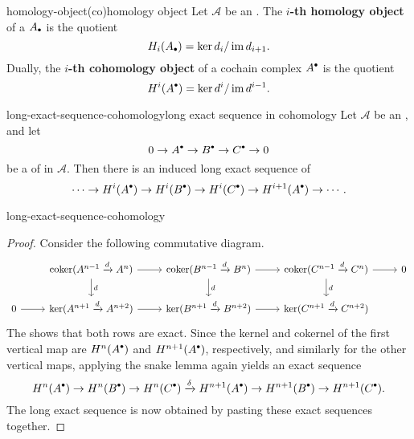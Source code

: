 \begin{topic}{homology-object}{(co)homology object}
    Let $\mathcal{A}$ be an . The \textbf{$i$-th homology object} of a  $A_\bdot$ is the quotient
    \[ H_i(A_\bdot) = \ker d_i / \im d_{i + 1} . \]
    Dually, the \textbf{$i$-th cohomology object} of a cochain complex $A^\bdot$ is the quotient
    \[ H^i(A^\bdot) = \ker d^i / \im d^{i - 1} . \]
\end{topic}

\begin{topic}{long-exact-sequence-cohomology}{long exact sequence in cohomology}
    Let $\mathcal{A}$ be an , and let
    \[ 0 \rightarrow A^\bdot \rightarrow B^\bdot \rightarrow C^\bdot \rightarrow 0 \]
    be a  of  in $\mathcal{A}$. Then there is an induced long exact sequence of 
    \[ \cdots \rightarrow H^i(A^\bdot) \rightarrow H^i(B^\bdot) \rightarrow H^i(C^\bdot) \rightarrow H^{i + 1}(A^\bdot) \rightarrow \cdots . \]
\end{topic}

\begin{example}{long-exact-sequence-cohomology}
\begin{proof}
    Consider the following commutative diagram.
    \[ \svg \begin{tikzcd}
        & \coker(A^{n - 1} \xrightarrow{d} A^n) \arrow{r} \arrow{d}{d} & \coker(B^{n - 1} \xrightarrow{d} B^n) \arrow{r} \arrow{d}{d} & \coker(C^{n - 1} \xrightarrow{d} C^n) \arrow{r} \arrow{d}{d} & 0 \\
        0 \arrow{r} & \ker(A^{n + 1} \xrightarrow{d} A^{n + 2}) \arrow{r} & \ker(B^{n + 1} \xrightarrow{d} B^{n + 2}) \arrow{r} & \ker(C^{n + 1} \xrightarrow{d} C^{n + 2}) &
    \end{tikzcd} \]
    The  shows that both rows are exact. Since the kernel and cokernel of the first vertical map are $H^n(A^\bdot)$ and $H^{n + 1}(A^\bdot)$, respectively, and similarly for the other vertical maps, applying the snake lemma again yields an exact sequence
    \[ H^n(A^\bdot) \to H^n(B^\bdot) \to H^n(C^\bdot) \xrightarrow{\delta} H^{n + 1}(A^\bdot) \to H^{n + 1}(B^\bdot) \to H^{n + 1}(C^\bdot) . \]
    The long exact sequence is now obtained by pasting these exact sequences together.
\end{proof}
\end{example}

